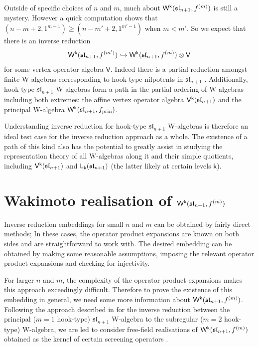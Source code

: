\documentclass[10pt,a4paper]{amsart}
\numberwithin{equation}{section}
\renewcommand{\ge}{\geqslant} %
\newcommand{\kk}{\mathsf{k}}   %
\DeclarePairedDelimiter{\brac}{\lparen}{\rparen}   %
\newcommand{\alg}[1]{\mathfrak{#1}}  %
\newcommand{\VOA}[1]{\mathsf{#1}}    %
\newcommand{\SLA}[2]{\alg{#1}_{#2}}                      %
\newcommand{\slnpone}{\SLA{sl}{n+1}}
\newcommand{\fprin}{f_\textup{prin}}                                %
\newcommand{\fhook}[1]{f^{(#1)}}                                  %
\newcommand{\Wsymb}{\VOA{W}}
\newcommand{\uaffvoa}[2]{\VOA{V}^{#1}\brac{#2}}                   %
\newcommand{\saffvoa}[2]{\VOA{L}_{#1}\brac{#2}}                   %
\newcommand{\uQHR}[3]{\Wsymb^{#1}\brac{#2,#3}}                    %
\theoremstyle{plain}
\begin{document}
Outside of specific choices of $n$ and $m$, much about $\uQHR{\kk}{\slnpone}{\fhook{m}}$ is still a mystery. However a quick computation shows that $(n-m+2,1^{m-1}) \ge (n-m'+2,1^{m'-1})$ when $m<m'$. So we expect that there is an inverse reduction
%
\begin{equation} \label{eq:invembHook}
    \uQHR{\kk}{\slnpone}{\fhook{m'}} \hookrightarrow \uQHR{\kk}{\slnpone}{\fhook{m}} \otimes \VOA{V}
\end{equation}
%
for some vertex operator algebra $\VOA{V}$. Indeed there is a partial reduction amongst finite W-algebras corresponding to hook-type nilpotents in $\slnpone$ \cite[Prop.~4.1.1]{GenStage22}. Additionally, hook-type $\slnpone$ W-algebras form a path in the partial ordering of W-algebras including both extremes: the affine vertex operator algebra $\uaffvoa{\kk}{\slnpone}$ and the principal W-algebra $\uQHR{\kk}{\slnpone}{\fprin}$. 

Understanding inverse reduction for hook-type $\slnpone$ W-algebras is therefore an ideal test case for the inverse reduction approach as a whole. The existence of a path of this kind also has the potential to greatly assist in studying the representation theory of all W-algebras along it and their simple quotients, including $\uaffvoa{\kk}{\slnpone}$ and $\saffvoa{\kk}{\slnpone}$ (the latter likely at certain levels $\kk$).

\section{Wakimoto realisation of \texorpdfstring{$\uQHR{\kk}{\slnpone}{\fhook{m}}$}{Wk(sln+1,fm)}} \label{sec:WakWalg}

Inverse reduction embeddings for small $n$ and $m$ can be obtained by fairly direct methods; In these cases, the operator product expansions are known on both sides and are straightforward to work with. The desired embedding can be obtained by making some reasonable assumptions, imposing the relevant operator product expansions and checking for injectivity. 

For larger $n$ and $m$, the complexity of the operator product expansions makes this approach exceedingly difficult. Therefore to prove the existence of this embedding in general, we need some more information about $\uQHR{\kk}{\slnpone}{\fhook{m}}$. Following the approach described in \cite{Feh21c} for the inverse reduction between the principal ($m=1$ hook-type) $\slnpone$ W-algebra to the subregular ($m=2$ hook-type) W-algebra, we are led to consider free-field realisations of $\uQHR{\kk}{\slnpone}{\fhook{m}}$ obtained as the kernel of certain screening operators \cite{Gen17}.
\end{document}
